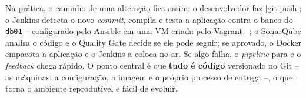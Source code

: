 Na prática, o caminho de uma alteração fica assim: o desenvolvedor faz \cod|git push|; o Jenkins
detecta o novo \textit{commit}, compila e testa a aplicação contra o banco do \texttt{db01} --
configurado pelo Ansible em uma VM criada pelo Vagrant --; o SonarQube analisa o código e o Quality
Gate decide se ele pode seguir; se aprovado, o Docker empacota a aplicação e o Jenkins a coloca no ar.
Se algo falha, o \textit{pipeline} para e o \textit{feedback} chega rápido. O ponto central é que
\textbf{tudo é código} versionado no Git -- as máquinas, a configuração, a imagem e o próprio processo
de entrega --, o que torna o ambiente reprodutível e fácil de evoluir.
